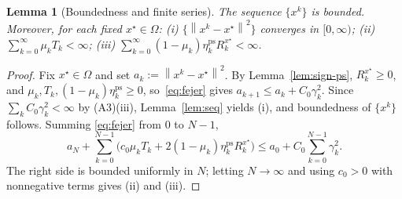 \documentclass[]{interact}
\theoremstyle{plain}
\newtheorem{lemma}[theorem]{Lemma}
\theoremstyle{definition}
\theoremstyle{remark}
\newcommand{\norm}[1]{\left\lVert #1 \right\rVert}
\newcommand{\ps}{\mathrm{ps}}
\begin{document}
\begin{lemma}[Boundedness and finite series]\label{lem:bounded}
The sequence $\{x^k\}$ is bounded. Moreover, for each fixed $x^\star\in\Omega$:
\textup{(i)} $\{\norm{x^k-x^\star}^2\}$ converges in $[0,\infty)$;
\textup{(ii)} $\sum_{k=0}^\infty\mu_k T_k<\infty$;
\textup{(iii)} $\sum_{k=0}^\infty(1-\mu_k)\eta^{\ps}_k R^{x^\star}_k<\infty$.
\end{lemma}
\begin{proof}
Fix $x^\star\in\Omega$ and set $a_k:=\norm{x^k-x^\star}^2$. By Lemma~\ref{lem:sign-ps},
$R^{x^\star}_k\ge0$, and $\mu_k,T_k,(1-\mu_k)\eta^{\ps}_k\ge0$, so~\eqref{eq:fejer} gives
$a_{k+1}\le a_k+C_0\gamma_k^2$. Since $\sum_k C_0\gamma_k^2<\infty$ by (A3)(iii),
Lemma~\ref{lem:seq} yields (i), and boundedness of $\{x^k\}$ follows. Summing
\eqref{eq:fejer} from $0$ to $N-1$,
\[
a_N+\sum_{k=0}^{N-1}\bigl(c_0\mu_k T_k+2(1-\mu_k)\eta^{\ps}_k R^{x^\star}_k\bigr)\le a_0+C_0\sum_{k=0}^{N-1}\gamma_k^2 .
\]
The right side is bounded uniformly in $N$; letting $N\to\infty$ and using $c_0>0$ with
nonnegative terms gives (ii) and (iii).
\end{proof}
\end{document}
